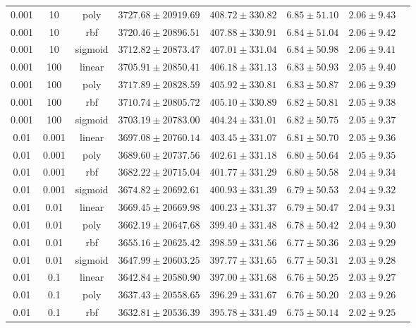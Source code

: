 \begin{tabular}{cccrrrrr}
0.001 & 10 & poly & $3727.68 \pm 20919.69$ & $408.72 \pm 330.82$ & $6.85 \pm 51.10$ & $2.06 \pm 9.43$\\
0.001 & 10 & rbf & $3720.46 \pm 20896.51$ & $407.88 \pm 330.91$ & $6.84 \pm 51.04$ & $2.06 \pm 9.42$\\
0.001 & 10 & sigmoid & $3712.82 \pm 20873.47$ & $407.01 \pm 331.04$ & $6.84 \pm 50.98$ & $2.06 \pm 9.41$\\
0.001 & 100 & linear & $3705.91 \pm 20850.41$ & $406.18 \pm 331.13$ & $6.83 \pm 50.93$ & $2.05 \pm 9.40$\\
0.001 & 100 & poly & $3717.89 \pm 20828.59$ & $405.92 \pm 330.81$ & $6.83 \pm 50.87$ & $2.06 \pm 9.39$\\
0.001 & 100 & rbf & $3710.74 \pm 20805.72$ & $405.10 \pm 330.89$ & $6.82 \pm 50.81$ & $2.05 \pm 9.38$\\
0.001 & 100 & sigmoid & $3703.19 \pm 20783.00$ & $404.24 \pm 331.01$ & $6.82 \pm 50.75$ & $2.05 \pm 9.37$\\
0.01 & 0.001 & linear & $3697.08 \pm 20760.14$ & $403.45 \pm 331.07$ & $6.81 \pm 50.70$ & $2.05 \pm 9.36$\\
0.01 & 0.001 & poly & $3689.60 \pm 20737.56$ & $402.61 \pm 331.18$ & $6.80 \pm 50.64$ & $2.05 \pm 9.35$\\
0.01 & 0.001 & rbf & $3682.22 \pm 20715.04$ & $401.77 \pm 331.29$ & $6.80 \pm 50.58$ & $2.04 \pm 9.34$\\
0.01 & 0.001 & sigmoid & $3674.82 \pm 20692.61$ & $400.93 \pm 331.39$ & $6.79 \pm 50.53$ & $2.04 \pm 9.32$\\
0.01 & 0.01 & linear & $3669.45 \pm 20669.98$ & $400.23 \pm 331.37$ & $6.79 \pm 50.47$ & $2.04 \pm 9.31$\\
0.01 & 0.01 & poly & $3662.19 \pm 20647.68$ & $399.40 \pm 331.48$ & $6.78 \pm 50.42$ & $2.04 \pm 9.30$\\
0.01 & 0.01 & rbf & $3655.16 \pm 20625.42$ & $398.59 \pm 331.56$ & $6.77 \pm 50.36$ & $2.03 \pm 9.29$\\
0.01 & 0.01 & sigmoid & $3647.99 \pm 20603.25$ & $397.77 \pm 331.65$ & $6.77 \pm 50.31$ & $2.03 \pm 9.28$\\
0.01 & 0.1 & linear & $3642.84 \pm 20580.90$ & $397.00 \pm 331.68$ & $6.76 \pm 50.25$ & $2.03 \pm 9.27$\\
0.01 & 0.1 & poly & $3637.43 \pm 20558.65$ & $396.29 \pm 331.67$ & $6.76 \pm 50.20$ & $2.03 \pm 9.26$\\
0.01 & 0.1 & rbf & $3632.81 \pm 20536.39$ & $395.78 \pm 331.49$ & $6.75 \pm 50.14$ & $2.02 \pm 9.25$\\

\end{tabular}
